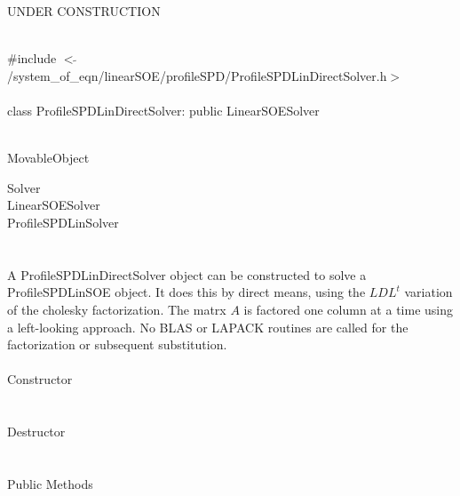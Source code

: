 
UNDER CONSTRUCTION

   \\
\indent \#include $<\tilde{
}$/system\_of\_eqn/linearSOE/profileSPD/ProfileSPDLinDirectSolver.h$>$
\\ 

  \\
class ProfileSPDLinDirectSolver: public LinearSOESolver  


 \\
MovableObject 

\indent\indent  Solver \\
\indent\indent\indent LinearSOESolver \\
\indent\indent\indent\indent ProfileSPDLinSolver \\
\indent\indent\indent\indent{} \\

  \\
\indent A ProfileSPDLinDirectSolver object can be constructed to solve
a ProfileSPDLinSOE object. It does this by direct means, using the
$LDL^t$ variation of the cholesky factorization. The matrx $A$ is
factored one column at a time using a left-looking approach. No BLAS
or LAPACK routines are called for the factorization or subsequent
substitution. \\ 

  \\
\indent\indent Constructor \\
\indent{}  \\ \\
\indent\indent Destructor \\
\indent{}\\  \\
\indent\indent Public Methods \\
\indent{} \\
\indent{} \\
\indent{}\\ 
\indent{}\\ 


